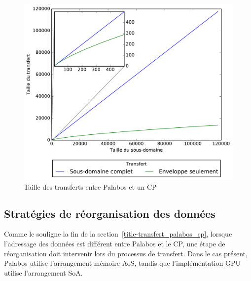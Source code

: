 \begin{figure}[h]
	\centering
	\includegraphics[scale=0.8, fbox]{../data/full_vs_partial_domain/full_vs_partial.pdf}
	\caption{Taille des transferts entre Palabos et un \ac{CP}}
	\label{fig:plb_full_vs_partial_transfert}
\end{figure}

\subsection{Stratégies de réorganisation des données}\label{title-strategie_reorganisation}
Comme le souligne la fin de la section~\ref{title-transfert_palabos_cp}, lorsque l'adressage des données est différent entre Palabos et le \ac{CP}, une étape de réorganisation doit intervenir lors du processus de transfert. Dans le cas présent, Palabos utilise l'arrangement mémoire \acs{AoS}, tandis que l'implémentation \acs{GPU} utilise l'arrangement \acs{SoA}.

